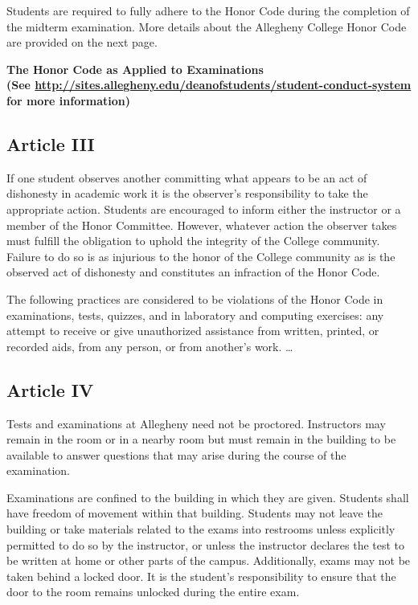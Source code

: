 \noindent
Students are required to fully adhere to the Honor Code during the completion of the midterm examination. More details
about the Allegheny College Honor Code are provided on the next page.

\newpage

\begin{center}
\bf
The Honor Code as Applied to Examinations\\
(See
\url{http://sites.allegheny.edu/deanofstudents/student-conduct-system}\\
for more information)
\end{center}
{\small
\subsection*{Article III}


If one student observes another committing what appears to be an act of
dishonesty in academic work it is the observer's responsibility to take
the appropriate action. Students are encouraged to inform either the
instructor or a member of the Honor Committee. However, whatever action
the observer takes must fulfill the obligation to uphold the integrity
of the College community. Failure to do so is as injurious to the honor
of the College community as is the observed act of dishonesty and
constitutes an infraction of the Honor Code.


The following practices are considered to be violations of the Honor
Code in examinations, tests, quizzes, and in laboratory and computing
exercises: any attempt to receive or give unauthorized assistance from
written, printed, or recorded aids, from any person, or from another's
work.
\ldots
\subsection*{Article IV}


Tests and examinations at Allegheny need not be proctored. Instructors
may remain in the room or in a nearby room but must remain in the
building to be available to answer questions that may arise during the
course of the examination.


Examinations are confined to the building in which they are given.
Students shall have freedom of movement within that building. Students
may not leave the building or take materials related to the exams into
restrooms unless explicitly permitted to do so by the instructor, or
unless the instructor declares the test to be written at home or other
parts of the campus. Additionally, exams may not be taken behind a
locked door. It is the student’s responsibility to ensure that the door
to the room remains unlocked during the entire exam.

}
